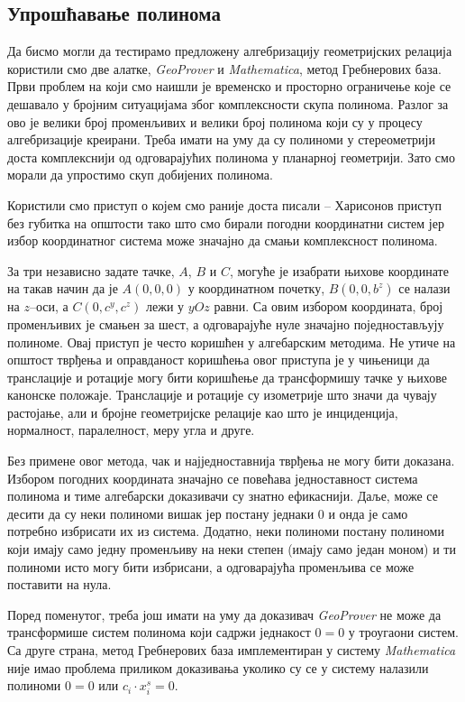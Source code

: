 \subsection{Упрошћавање полинома}
\label{simplification_6glava}

Да бисмо могли да тестирамо предложену алгебризацију геометријских
релација користили смо две алатке, \emph{GeoProver} и
\emph{Mathematica}, метод Гребнерових база. Први проблем на који смо
наишли је временско и просторно ограничење које се дешавало у бројним
ситуацијама због комплексности скупа полинома. Разлог за ово је велики
број променљивих и велики број полинома који су у процесу
алгебризације креирани. Треба имати на уму да су полиноми у
стереометрији доста комплекснији од одговарајућих полинома у
планарној геометрији. Зато смо морали да упростимо скуп добијених
полинома.

Користили смо приступ о којем смо раније доста писали -- Харисонов
приступ без губитка на општости \cite{wlog} тако што смо бирали
погодни координатни систем јер избор координатног система може
значајно да смањи комплексност полинома.


За три независно задате тачке, $A$, $B$ и $C$, могуће је изабрати
њихове координате на такав начин да је $A(0, 0, 0)$ у координатном
почетку, $B(0, 0, b^z)$ се налази на $z$--оси, а $C(0, c^y, c^z)$ лежи
у $yOz$ равни. Са овим избором координата, број променљивих је смањен
за шест, а одговарајуће нуле значајно поједностављују полиноме. Овај
приступ је често коришћен у алгебарским методима. Не утиче на општост
тврђења и оправданост коришћења овог приступа је у чињеници да
транслације и ротације могу бити коришћење да трансформишу тачке у
њихове канонске положаје. Транслације и ротације су изометрије што
значи да чувају растојање, али и бројне геометријске релације као што
је инциденција, нормалност, паралелност, меру угла и друге.

Без примене овог метода, чак и најједноставнија тврђења не могу бити
доказана. Избором погодних координата значајно се повећава
једноставност система полинома и тиме алгебарски доказивачи су знатно
ефикаснији. Даље, може се десити да су неки полиноми вишак јер постану
једнаки $0$ и онда је само потребно избрисати их из система. Додатно,
неки полиноми постану полиноми који имају само једну променљиву на
неки степен (имају само један моном) и ти полиноми исто могу бити
избрисани, а одговарајућа променљива се може поставити на нула. 

Поред поменутог, треба још имати на уму да доказивач \emph{GeoProver}
не може да трансформише систем полинома који садржи једнакост $0 = 0$
у троугаони систем. Са друге страна, метод Гребнерових база
имплементиран у систему \emph{Mathematica} није имао проблема приликом
доказивања уколико су се у систему налазили полиноми $0 = 0$ или
$c_i\cdot x_i^s = 0$.

